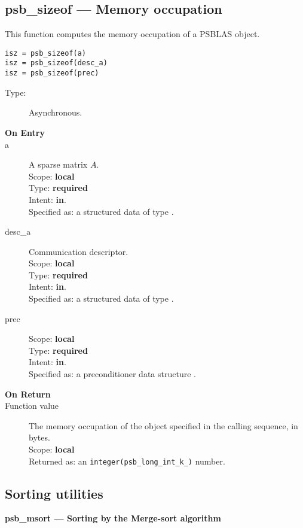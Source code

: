 \clearpage\subsection*{psb\_sizeof --- Memory occupation}

This function computes the memory occupation of a PSBLAS object.


\begin{verbatim}
isz = psb_sizeof(a)
isz = psb_sizeof(desc_a)
isz = psb_sizeof(prec)
\end{verbatim}

\begin{description}
\item[Type:] Asynchronous.
\item[\bf On Entry]
\item[a] A sparse matrix
$A$. \\ 
Scope: {\bf local} \\
Type: {\bf required}\\
Intent: {\bf in}.\\
Specified as: a structured data of type \spdata.
\item[desc\_a] Communication descriptor.\\
Scope: {\bf local} \\
Type: {\bf required}\\
Intent: {\bf in}.\\
Specified as: a structured data of type \descdata.
\item[prec] 
Scope: {\bf local} \\
Type: {\bf required}\\
Intent: {\bf in}.\\
Specified as: a preconditioner data structure \precdata.
\item[\bf On Return] 
\item[Function value] The memory occupation of the object specified in
  the calling sequence, in bytes.\\
Scope: {\bf local} \\
Returned  as: an \verb|integer(psb_long_int_k_)| number.
\end{description}


\clearpage\subsection*{Sorting utilities}

{\par\noindent\large\bfseries psb\_msort --- Sorting by the Merge-sort
  algorithm}

